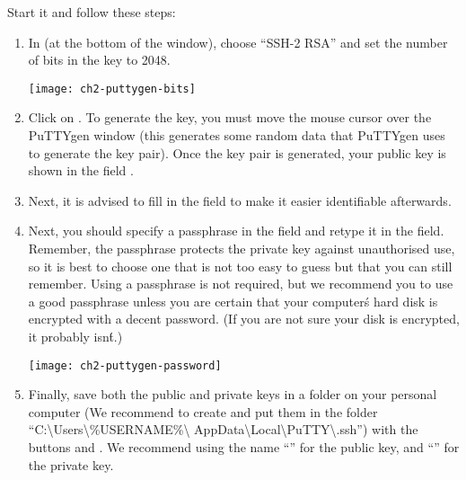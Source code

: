   Start  it and follow these steps:

  \begin{enumerate}
    \item  In  (at the bottom of the window), choose
      ``SSH-2 RSA'' and set the number of bits in the key to 2048.
    
    \begin{center}
    \texttt{[image: ch2-puttygen-bits]}
    \end{center}

    \item  Click on . To generate the key, you must move
      the mouse cursor over the PuTTYgen window (this generates some random
      data that PuTTYgen uses to generate the key pair). Once the key pair is
      generated, your public key is shown in the field
      .
    \item  Next, it is advised to fill in the  field
      to make it easier identifiable afterwards.
    \item  Next, you should specify a passphrase in the 
      field and retype it in the  field.
      Remember, the passphrase protects the private key against unauthorised
      use, so it is best to choose one that is not too easy to guess but that
      you can still remember.
      Using a passphrase is not required, but we recommend you to use a good
      passphrase unless you are certain that your computer\'s hard disk is
      encrypted with a decent password. (If you are not sure your disk is
      encrypted, it probably isn\'t.)

    \begin{center}
    \texttt{[image: ch2-puttygen-password]}
    \end{center}

    \item  Finally, save both the public and private keys in a folder on your
      personal computer (We recommend to create and put them in the folder
      ``C:\textbackslash Users\textbackslash \%USERNAME\%\textbackslash
      AppData\textbackslash Local\textbackslash PuTTY\textbackslash .ssh'')
      with the buttons  and .
      We recommend using the name ``'' for the public key,
      and ``'' for the private key.
  \end{enumerate}

